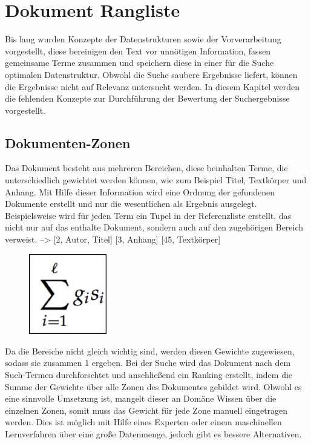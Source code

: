 \section {Dokument Rangliste}
Bis lang wurden Konzepte der Datenstrukturen sowie der Vorverarbeitung
vorgestellt, diese bereinigen den Text vor unnötigen Information,
fassen gemeinsame Terme zusammen und speichern diese in einer für die
Suche optimalen Datenstruktur. Obwohl die Suche saubere Ergebnisse
liefert, können die Ergebnisse nicht auf Relevanz untersucht werden.
\newline
In diesem Kapitel werden die fehlenden Konzepte zur Durchführung der
Bewertung der Suchergebnisse vorgestellt.

\subsection[Dokumenten{}-Zonen]{Dokumenten-Zonen}
Das Dokument besteht aus mehreren Bereichen, diese beinhalten Terme, die
unterschiedlich gewichtet werden können, wie zum Beispiel Titel,
Textkörper und Anhang. Mit Hilfe dieser Information wird eine Ordnung
der gefundenen Dokumente erstellt und nur die wesentlichen als Ergebnis
ausgelegt.
\bigbreak
Beispielsweise wird für jeden Term ein Tupel in der Referenzliste
erstellt, das nicht nur auf das enthalte Dokument, sondern auch auf den
zugehörigen Bereich verweist. 
\bigbreak
[Willy]--{\textgreater} [2, Autor, Titel] [3, Anhang] [45, Textkörper]
\newline
\begin{figure}
  \centering
\includegraphics[width=3.381cm,height=3.507cm]{bilder/SeminararbeitArkadij-img3.png}
\end{figure}
Da die Bereiche nicht gleich wichtig sind, werden diesen Gewichte
zugewiesen, sodass sie zusammen 1 ergeben. Bei der Suche wird das
Dokument nach dem Such-Termen durchforschtet und anschließend ein
Ranking erstellt, indem die Summe der Gewichte über alle Zonen des
Dokumentes gebildet wird. 
\bigbreak
Obwohl es eine sinnvolle Umsetzung ist, mangelt dieser an Domäne Wissen
über die einzelnen Zonen, somit muss das Gewicht für jede Zone manuell
eingetragen werden. Dies ist möglich mit Hilfe eines Experten oder
einem maschinellen Lernverfahren über eine große Datenmenge, jedoch
gibt es bessere Alternativen. 

